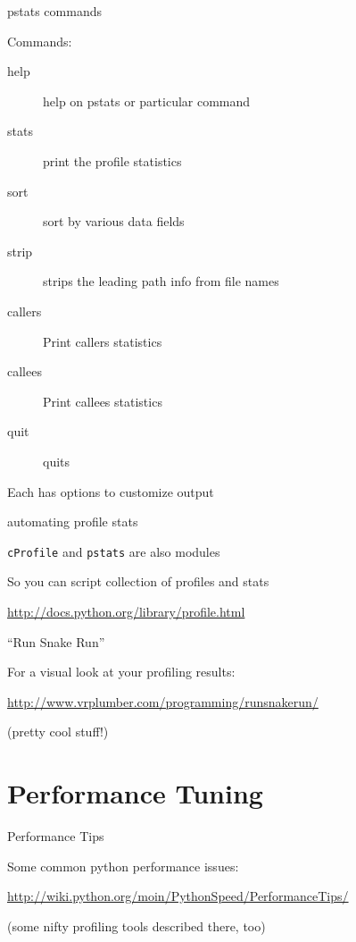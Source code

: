 \documentclass{beamer}
\begin{document}
\begin{frame}[fragile]{pstats commands}

{\Large Commands:}

\begin{description}
  \item[help] help on pstats or particular command
  \item[stats] print the profile statistics
  \item[sort] sort by various data fields
  \item[strip] strips the leading path info from file names
  \item[callers] Print callers statistics
  \item[callees] Print callees statistics
  \item[quit] quits
\end{description}
{\large Each has options to customize output}

\end{frame} 

\begin{frame}[fragile]{automating profile stats}

{\Large \verb|cProfile| and \verb|pstats| are also modules}

\vfill
{\Large So you can script collection of profiles and stats}

\vfill
\url{http://docs.python.org/library/profile.html}

\end{frame} 

\begin{frame}[fragile]{``Run Snake Run''}

\vfill
{\Large For a visual look at your profiling results:}

\vfill
\url{http://www.vrplumber.com/programming/runsnakerun/}

\vfill
(pretty cool stuff!)

\end{frame} 

\section{Performance Tuning}

\begin{frame}[fragile]{Performance Tips}

\vfill
{\Large Some common python performance issues:}

\vfill
\url{http://wiki.python.org/moin/PythonSpeed/PerformanceTips/}

\vfill
(some nifty profiling tools described there, too)

\end{frame} 
\end{document}
